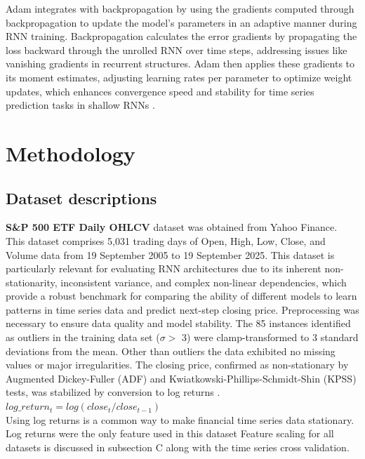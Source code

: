 \documentclass[conference, 10pt]{IEEEtran}
\begin{document}
Adam integrates with backpropagation by using the gradients computed through backpropagation to update the model's
parameters in an adaptive manner during RNN training. Backpropagation calculates the error gradients by propagating the
loss backward through the unrolled RNN over time steps, addressing issues like vanishing gradients in recurrent
structures. Adam then applies these gradients to its moment estimates, adjusting learning rates per parameter to
optimize weight updates, which enhances convergence speed and stability for time series prediction tasks in shallow RNNs \cite{machinelearningmasteryGentleIntroduction}.

\section{Methodology}
\subsection{Dataset descriptions}

\textbf{S\&P 500 ETF Daily OHLCV} dataset was obtained from Yahoo Finance. This dataset comprises 5,031 trading days of
Open, High, Low, Close, and Volume data from 19 September 2005 to 19 September 2025. This dataset is particularly
relevant for evaluating RNN architectures due to its inherent non-stationarity, inconsistent variance, and complex
non-linear dependencies, which provide a robust benchmark for comparing the ability of different models to learn
patterns in time series data and predict next-step closing price. Preprocessing was necessary to ensure data quality and
model stability. The 85 instances identified as outliers in the training data set ($\sigma >$ 3) were clamp-transformed
to 3 standard deviations from the mean. Other than outliers the data exhibited no missing values or major
irregularities. The closing price, confirmed as non-stationary by Augmented Dickey-Fuller (ADF) and
Kwiatkowski-Phillips-Schmidt-Shin (KPSS) tests, was stabilized by conversion to log returns \cite{StationarityTests}.\\

$log\_return_t = log(close_t / close_{t-1})$\\

Using log returns is a common way to make financial time series data stationary. Log returns were the only feature used
in this dataset Feature scaling for all datasets is discussed in subsection C along with the time series cross
validation.
\end{document}
